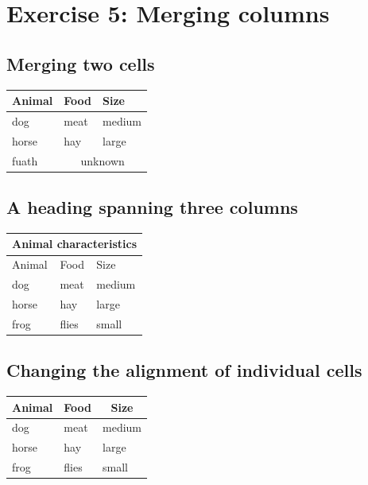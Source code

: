 \documentclass{article}
\begin{document}
\section*{Exercise 5: Merging columns}

\subsection*{Merging two cells}

\begin{tabular}{lll}
\toprule
Animal & Food & Size \\
\midrule
dog & meat & medium \\
horse & hay & large \\
fuath & \multicolumn{2}{c}{unknown} \\
\bottomrule
\end{tabular}

\subsection*{A heading spanning three columns}

\begin{tabular}{lll}
\toprule
\multicolumn{3}{c}{Animal characteristics} \\
\midrule
Animal & Food & Size \\
\midrule
dog & meat & medium \\
horse & hay & large \\
frog & flies & small \\
\bottomrule
\end{tabular}

\subsection*{Changing the alignment of individual cells}

\begin{tabular}{lll}
\toprule
\multicolumn{1}{c}{Animal} &
\multicolumn{1}{c}{Food} &
\multicolumn{1}{c}{Size} \\
\midrule
dog & meat & medium \\
horse & hay & large \\
frog & flies & small \\
\bottomrule
\end{tabular}
\end{document}

